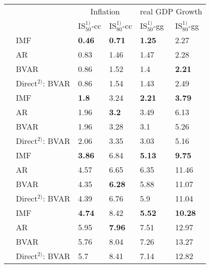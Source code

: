 \begin{table}[!h]
\centering
\begin{tabular}{llllll}
\toprule
\multicolumn{2}{c}{ } & \multicolumn{2}{c}{{Inflation}} & \multicolumn{2}{c}{{real GDP Growth}} \\
\cmidrule(l{3pt}r{3pt}){3-4} \cmidrule(l{3pt}r{3pt}){5-6}
 &  & $\text{IS}_{50}^{1)}$-cc & $\text{IS}_{80}^{1)}$-cc & $\text{IS}_{50}^{1)}$-gg & $\text{IS}_{80}^{1)}$-gg\\
\midrule
 & IMF & \textbf{0.46} & \textbf{0.71} & \textbf{1.25} & 2.27\\
\parbox[t]{2mm}{}
 & AR & 0.83 & 1.46 & 1.47 & 2.28\\
 & BVAR & 0.86 & 1.52 & 1.4 & \textbf{2.21}\\
 & Direct$^{2)}$: BVAR & 0.86 & 1.54 & 1.43 & 2.49\\
\addlinespace
 & IMF & \textbf{1.8} & 3.24 & \textbf{2.21} & \textbf{3.79}\\
\parbox[t]{2mm}{}
 & AR & 1.96 & \textbf{3.2} & 3.49 & 6.13\\
 & BVAR & 1.96 & 3.28 & 3.1 & 5.26\\
 & Direct$^{2)}$: BVAR & 2.06 & 3.35 & 3.03 & 5.16\\
\addlinespace
 & IMF & \textbf{3.86} & 6.84 & \textbf{5.13} & \textbf{9.75}\\
\parbox[t]{2mm}{}
 & AR & 4.57 & 6.65 & 6.35 & 11.46\\
 & BVAR & 4.35 & \textbf{6.28} & 5.88 & 11.07\\
 & Direct$^{2)}$: BVAR & 4.39 & 6.76 & 5.9 & 11.04\\
\addlinespace
 & IMF & \textbf{4.74} & 8.42 & \textbf{5.52} & \textbf{10.28}\\
\parbox[t]{2mm}{}
 & AR & 5.95 & \textbf{7.96} & 7.51 & 12.97\\
 & BVAR & 5.76 & 8.04 & 7.26 & 13.27\\
 & Direct$^{2)}$: BVAR & 5.7 & 8.41 & 7.14 & 12.82\\
\bottomrule
\end{tabular}
\end{table}

